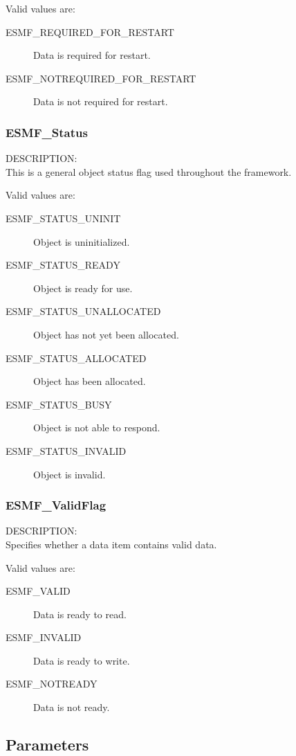 Valid values are:
\begin{description}
   \item [ESMF\_REQUIRED\_FOR\_RESTART] 
         Data is required for restart.
   \item [ESMF\_NOTREQUIRED\_FOR\_RESTART]
         Data is not required for restart.
\end{description}

\subsubsection{ESMF\_Status}
\label{opt:status}
{\sf DESCRIPTION:\\}
This is a general object status flag used throughout the
framework.

Valid values are:
\begin{description}
   \item [ESMF\_STATUS\_UNINIT] 
         Object is uninitialized.
   \item [ESMF\_STATUS\_READY]
         Object is ready for use.
   \item [ESMF\_STATUS\_UNALLOCATED]
         Object has not yet been allocated.
   \item [ESMF\_STATUS\_ALLOCATED]
         Object has been allocated.
   \item [ESMF\_STATUS\_BUSY]
         Object is not able to respond.
   \item [ESMF\_STATUS\_INVALID]
         Object is invalid.
\end{description}


\subsubsection{ESMF\_ValidFlag}
\label{opt:validflag}
{\sf DESCRIPTION:\\}
Specifies whether a data item contains valid data.

Valid values are:
\begin{description}
   \item [ESMF\_VALID] 
         Data is ready to read.
   \item [ESMF\_INVALID]
         Data is ready to write.
   \item [ESMF\_NOTREADY]
         Data is not ready.
\end{description}


\subsection{Parameters}

